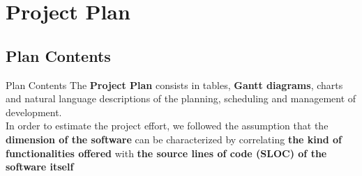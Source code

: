 \documentclass{../common/latex_classes/pdf_presentation}
\begin{document}
	\section{Project Plan}
	\subsection{Plan Contents} 
	\begin{frame}{Plan Contents}
		The \textbf{Project Plan} consists in tables, \textbf{Gantt diagrams}, charts and natural language descriptions of the planning, scheduling and management of \myTaxiService{} development. \\
		\medskip
		In order to estimate the project effort, we followed the assumption that the \textbf{dimension of the software} can be characterized by correlating \textbf{the kind of functionalities offered} with \textbf{the source lines of code (SLOC) of the software itself}
	\end{frame}
\end{document}

